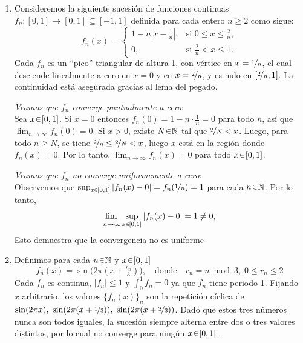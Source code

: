 \begin{sol}
\begin{enumerate}[label = (\roman*)]
\[
\lim_{n\to\infty} \abs{\int^1_0f_n(x) \dd{x}} = 0,
\quad\text{de donde se sigue,}\quad
\lim_{n\to\infty} \int^1_0f_n(x) \dd{x} = 0.
\]
\item %
Consideremos la siguiente sucesión de funciones continuas $f_n \colon [0,1] \to [0,1] \subseteq [-1,1]$ definida para cada entero $n \geq 2$ como sigue:
\[
f_n(x) =
\begin{cases}
1 - n \left| x - \frac{1}{n} \right|, & \text{si } 0 \le x \le \frac{2}{n}, \\[4pt]
0, & \text{si } \frac{2}{n} < x \le 1.
\end{cases}
\]
Cada $f_n$ es un \enquote{pico} triangular de altura 1, con vértice en $x = \nicefrac{1}{n}$, el cual desciende linealmente a cero en $x = 0$ y en $x = \nicefrac{2}{n}$, y es nulo en $[\nicefrac{2}{n}, 1]$. La continuidad está asegurada gracias al lema del pegado.

\emph{Veamos que $f_n$ converge puntualmente a cero}:\\ 
Sea $x \en [0,1]$. Si $x = 0$ entonces $f_n(0) = 1 - n \cdot \frac{1}{n} = 0$ para todo $n$, así que $\lim_{n\to\infty} f_n(0)=0$. Si $x > 0$, existe $N \en \mathbb{N}$ tal que $\nicefrac{2}{N} < x$. Luego, para todo $n \ge N$, se tiene $\nicefrac{2}{n} \le \nicefrac{2}{N} < x$, luego $x$ está en la región donde $f_n(x)=0$. Por lo tanto, $\lim_{n\to\infty} f_n(x)=0$ para todo $x \en [0,1]$.

\emph{Veamos que $f_n$ no converge uniformemente a cero}:\\ 
Observemos que $\sup_{x \en [0,1]} |f_n(x) - 0| = f_n(\nicefrac{1}{n}) = 1$ para cada $n \en \mathbb{N}$. Por lo tanto,
\[
\adjustlimits\lim_{n\to\infty}\sup_{x \en [0,1]} |f_n(x) - 0| = 1 \neq 0,
\]
Esto demuestra que la convergencia no es uniforme 
\item %
Definimos para cada $n\en\mathbb{N}$ y $x\en[0,1]$
\[
f_n(x)=\sin\bigl(2\pi (x+\tfrac{r_n}{3})\bigr),
\quad\text{donde}\quad
r_n=n\bmod 3,\; 0 \le r_n \le 2
\]
Cada $f_n$ es continua, $|f_n|\le1$ y $\int_0^1 f_n=0$ ya que $f_n$ tiene periodo 1.
Fijando $x$ arbitrario, los valores $\{f_n(x)\}_n$ son la repetición cíclica de
$\sin(2\pi x),\ \sin(2\pi(x+\nicefrac13)),\ \sin(2\pi(x+\nicefrac23))$.
Dado que estos tres números nunca son todos iguales, la sucesión siempre alterna entre dos o tres valores distintos, por lo cual no converge para ningún $x\en[0,1]$. 
\end{enumerate}
\end{sol}